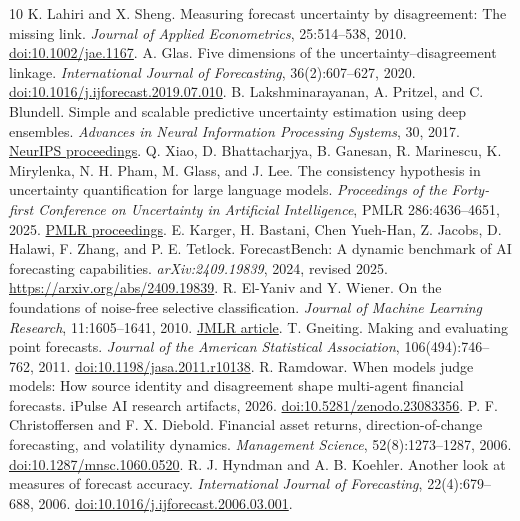 \begin{thebibliography}{10}
 K. Lahiri and X. Sheng. Measuring forecast uncertainty by disagreement: The missing link. \emph{Journal of Applied Econometrics}, 25:514--538, 2010. \href{https://doi.org/10.1002/jae.1167}{doi:10.1002/jae.1167}.
 A. Glas. Five dimensions of the uncertainty--disagreement linkage. \emph{International Journal of Forecasting}, 36(2):607--627, 2020. \href{https://doi.org/10.1016/j.ijforecast.2019.07.010}{doi:10.1016/j.ijforecast.2019.07.010}.
 B. Lakshminarayanan, A. Pritzel, and C. Blundell. Simple and scalable predictive uncertainty estimation using deep ensembles. \emph{Advances in Neural Information Processing Systems}, 30, 2017. \href{https://proceedings.neurips.cc/paper/2017/hash/9ef2ed4b7fd2c810847ffa5fa85bce38-Abstract.html}{NeurIPS proceedings}.
 Q. Xiao, D. Bhattacharjya, B. Ganesan, R. Marinescu, K. Mirylenka, N. H. Pham, M. Glass, and J. Lee. The consistency hypothesis in uncertainty quantification for large language models. \emph{Proceedings of the Forty-first Conference on Uncertainty in Artificial Intelligence}, PMLR 286:4636--4651, 2025. \href{https://proceedings.mlr.press/v286/xiao25a.html}{PMLR proceedings}.
 E. Karger, H. Bastani, Chen Yueh-Han, Z. Jacobs, D. Halawi, F. Zhang, and P. E. Tetlock. ForecastBench: A dynamic benchmark of AI forecasting capabilities. \emph{arXiv:2409.19839}, 2024, revised 2025. \url{https://arxiv.org/abs/2409.19839}.
 R. El-Yaniv and Y. Wiener. On the foundations of noise-free selective classification. \emph{Journal of Machine Learning Research}, 11:1605--1641, 2010. \href{https://www.jmlr.org/papers/v11/el-yaniv10a.html}{JMLR article}.
 T. Gneiting. Making and evaluating point forecasts. \emph{Journal of the American Statistical Association}, 106(494):746--762, 2011. \href{https://doi.org/10.1198/jasa.2011.r10138}{doi:10.1198/jasa.2011.r10138}.
 R. Ramdowar. When models judge models: How source identity and disagreement shape multi-agent financial forecasts. iPulse AI research artifacts, 2026. \href{https://doi.org/10.5281/zenodo.23083356}{doi:10.5281/zenodo.23083356}.
 P. F. Christoffersen and F. X. Diebold. Financial asset returns, direction-of-change forecasting, and volatility dynamics. \emph{Management Science}, 52(8):1273--1287, 2006. \href{https://doi.org/10.1287/mnsc.1060.0520}{doi:10.1287/mnsc.1060.0520}.
 R. J. Hyndman and A. B. Koehler. Another look at measures of forecast accuracy. \emph{International Journal of Forecasting}, 22(4):679--688, 2006. \href{https://doi.org/10.1016/j.ijforecast.2006.03.001}{doi:10.1016/j.ijforecast.2006.03.001}.
\end{thebibliography}
